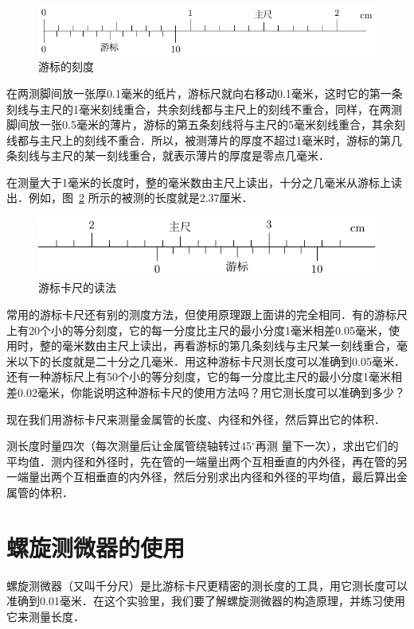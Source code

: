 \begin{figure}[htbp]
    \centering
    \includegraphics{fig/A/10-2.pdf}
    \caption{游标的刻度}\label{fig_A_10-2}
\end{figure}

在两测脚间放一张厚0.1毫米的纸片，游标尺就向右移动0.1毫米，这时它的第一条刻线与主尺的1毫米刻线重合，共余刻线都与主尺上的刻线不重合，同样，在两测脚间放一张0.5毫米的薄片，游标的第五条刻线将与主尺的5毫米刻线重合，其余刻线都与主尺上的刻线不重合．所以，被测薄片的厚度不超过1毫米时，游标的第几条刻线与主尺的某一刻线重合，就表示薄片的厚度是零点几毫米．

在测量大于1毫米的长度时，整的毫米数由主尺上读出，十分之几毫米从游标上读出．例如，图~\ref{fig_A_10-3} 所示的被测的长度就是2.37厘米．
	
\begin{figure}[htbp]
    \centering
    \includegraphics{fig/A/10-3.pdf}
    \caption{游标卡尺的读法}\label{fig_A_10-3}
\end{figure}	
	
常用的游标卡尺还有别的测度方法，但使用原理跟上面讲的完全相同．有的游标尺上有20个小的等分刻度，它的每一分度比主尺的最小分度1毫米相差0.05毫米，使用时，整的毫米数由主尺上读出，再看游标的第几条刻线与主尺某一刻线重合，毫米以下的长度就是二十分之几毫米．用这种游标卡尺测长度可以准确到0.05毫米．还有一种游标尺上有50个小的等分刻度，它的每一分度比主尺的最小分度1毫米相差0.02毫米，你能说明这种游标卡尺的使用方法吗？用它测长度可以准确到多少？

现在我们用游标卡尺来测量金属管的长度、内径和外径，然后算出它的体积．

测长度时量四次（每次测量后让金属管绕轴转过45$^\circ$再测
量下一次），求出它们的平均值．测内径和外径时，先在管的一端量出两个互相垂直的内外径，再在管的另一端量出两个互相垂直的内外径，然后分别求出内径和外径的平均值，最后算出金属管的体积．

\section{螺旋测微器的使用}
螺旋测微器（又叫千分尺）是比游标卡尺更精密的测长度的工具，用它测长度可以准确到0.01毫米．在这个实验里，我们要了解螺旋测微器的构造原理，并练习使用它来测量长度．

